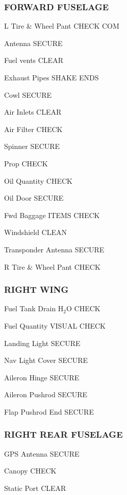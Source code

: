 \begin{multicols}{2}
\subsubsection*{FORWARD FUSELAGE }
\begin{enumerate*}
\item L Tire \& Wheel Pant \dotfill CHECK COM
\item Antenna \dotfill SECURE
\item Fuel vents \dotfill CLEAR
\item Exhaust Pipes \dotfill SHAKE ENDS
\item Cowl \dotfill SECURE
\item Air Inlets \dotfill CLEAR
\item Air Filter \dotfill CHECK
\item Spinner \dotfill SECURE
\item Prop \dotfill CHECK
\item Oil Quantity \dotfill CHECK 
\item Oil Door \dotfill SECURE
\item Fwd Baggage \dotfill ITEMS CHECK
\item Windshield \dotfill CLEAN
\item Transponder Antenna \dotfill SECURE
\item R Tire \& Wheel Pant \dotfill CHECK
\end{enumerate*}

\subsubsection*{RIGHT WING }
\begin{enumerate*}
\item Fuel Tank Drain \dotfill $\mathrm{H_{2}O}$ CHECK 
\item Fuel Quantity \dotfill VISUAL CHECK
\item Landing Light \dotfill SECURE
\item Nav Light Cover \dotfill SECURE
\item Aileron Hinge \dotfill SECURE
\item Aileron Pushrod \dotfill SECURE
\item Flap Pushrod End \dotfill SECURE
\end{enumerate*}

\subsubsection*{RIGHT REAR FUSELAGE }
\begin{enumerate*}
\item GPS Antenna \dotfill SECURE
\item Canopy \dotfill CHECK
\item Static Port \dotfill CLEAR
\end{enumerate*}


\end{multicols}
